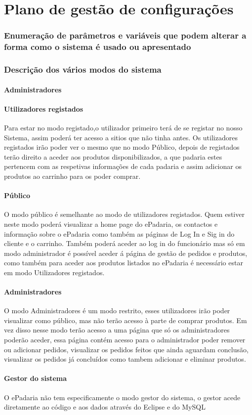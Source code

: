 \chapter{Plano de gestão de configurações}
\label{plano_de_gestao_de_configuracoes}

\subsection{Enumeração de parâmetros e variáveis que podem alterar a forma como o sistema é usado ou apresentado}

\subsection{Descrição dos vários modos do sistema}
\subsubsection{Administradores}
\subsubsection{Utilizadores registados}
Para estar no modo registado,o utilizador primeiro terá de se registar no nosso Sistema, assim poderá ter acesso a sitios que não tinha antes. Os utilizadores registados irão poder ver o mesmo que no modo Público, depois de registados terão direito a aceder aos produtos disponibilizados, a que padaria estes pertencem com as respetivas informações de cada padaria e assim adicionar os produtos ao carrinho para os poder comprar.
\subsubsection{Público}
O modo público é semelhante ao modo de utilizadores registados. Quem estiver neste modo poderá visualizar a home page do ePadaria, os contactos e informação sobre o ePadaria como também as páginas de Log In e Sig in do cliente e o carrinho. Também poderá aceder ao log in do funcionário mas só em modo administrador é possível aceder á página de gestão de pedidos e produtos, como também para aceder aos produtos listados no ePadaria é necessário estar em modo Utilizadores registados.
\subsubsection{Administradores}
O modo Administradores é um modo restrito, esses utilizadores irão poder visualizar como público, mas não terão acesso à parte de comprar produtos. Em vez disso nesse modo terão acesso a uma página que só os administradores poderão aceder, essa página contém acesso para o administrador poder remover ou adicionar pedidos, visualizar os pedidos feitos que ainda aguardam conclusão, visualizar os pedidos já concluídos como tambem adicionar e eliminar produtos.
\subsubsection{Gestor do sistema}
O ePadaria não tem especificamente o modo gestor do sistema, o gestor acede diretamente ao código e aos dados através do Eclipse e do MySQL